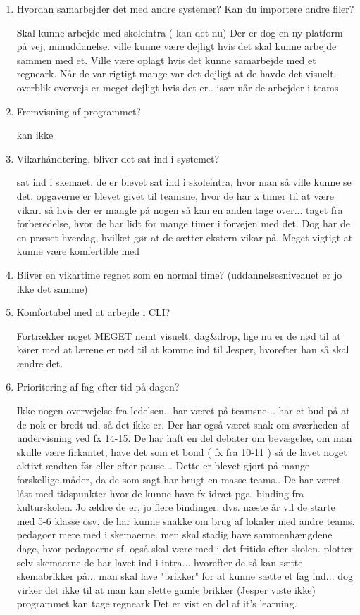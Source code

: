 \begin{enumerate}
	
	\item Hvordan samarbejder det med andre systemer? Kan du importere andre filer?
	
	Skal kunne arbejde med skoleintra ( kan det nu) Der er dog en ny platform på vej, minuddanelse. ville kunne være dejligt hvis det skal kunne arbejde sammen med et. Ville være oplagt hvis det kunne samarbejde med et regneark. Når de var rigtigt mange var det dejligt at de havde det visuelt. overblik overvejs er meget dejligt hvis det er.. især når de arbejder i teams
	
	\item Fremvisning af programmet?
	
	kan ikke
	
	\item Vikarhåndtering, bliver det sat ind i systemet?
	
	sat ind i skemaet. de er blevet sat ind i skoleintra, hvor man så ville kunne se det. opgaverne er blevet givet til teamsne, hvor de har x timer til at være vikar. så hvis der er mangle på nogen så kan en anden tage over... taget fra forberedelse, hvor de har lidt for mange timer i forvejen med det. Dog har de en præset hverdag, hvilket gør at de sætter ekstern vikar på. Meget vigtigt at kunne være komfertible med 
	
	\item Bliver en vikartime regnet som en normal time? (uddannelsesniveauet er jo ikke det samme)
	
	
	
	\item Komfortabel med at arbejde i CLI?
	
	Fortrækker noget MEGET nemt visuelt, dag\&drop, lige nu er de nød til at kører med at lærene er nød til at komme ind til Jesper, hvorefter han så skal ændre det.  
	
	\item Prioritering af fag efter tid på dagen?
	
	Ikke nogen overvejelse fra ledelsen.. har været på teamsne .. har et bud på at de nok er bredt ud, så det ikke er. Der har også været snak om sværheden af undervisning ved fx 14-15. De har haft en del debater om bevægelse, om man skulle være firkantet, have det som et bond ( fx fra 10-11 )  så de lavet noget aktivt ændten før eller efter pause... Dette er blevet gjort på mange forskellige måder, da de som sagt har brugt en masse teams.. De har været låst med tidspunkter hvor de kunne have fx idræt pga. binding fra kulturskolen. Jo ældre de er, jo flere bindinger.  dvs. næste år vil de starte med 5-6 klasse osv. de har kunne snakke om brug af lokaler med andre teams. pedagoer mere med i skemaerne. men skal stadig have sammenhængdene dage, hvor pedagoerne sf. også skal være med i det fritids efter skolen. plotter selv skemaerne de har lavet ind i intra... hvorefter de så kan sætte skemabrikker på... man skal lave "brikker" for at kunne sætte et fag ind... dog virker det ikke til at man kan slette gamle brikker (Jesper viste ikke)
	programmet kan tage regneark Det er vist en del af it's learning. 


\end{enumerate}
